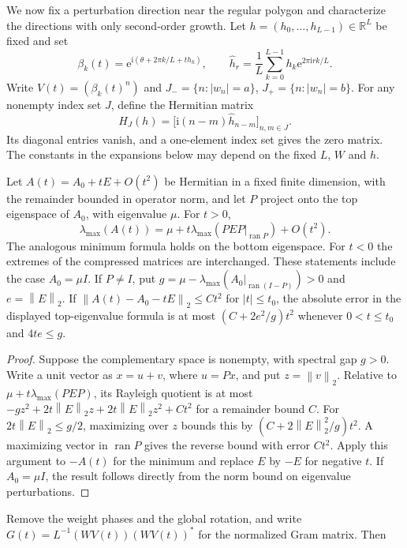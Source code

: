 \documentclass[10pt,twoside,final]{siamart1116}
\numberwithin{equation}{section}
\numberwithin{theorem}{section}
\newcommand{\R}{\mathbb R}
\newcommand{\norm}[1]{\left\lVert#1\right\rVert_2}
\newcommand{\e}{\mathrm e}
\newcommand{\ii}{\mathrm i}
\begin{document}
We now fix a perturbation direction near the regular polygon and characterize the
directions with only second-order growth. Let
$h=(h_0,\ldots,h_{L-1})\in\R^L$ be fixed and set
\begin{equation}\label{eq:direction-nodes}
\beta_k(t)=\e^{\ii(\theta+2\pi k/L+t h_k)},\qquad
\widehat h_r=\frac1L\sum_{k=0}^{L-1}h_k \e^{2\pi\ii rk/L}.
\end{equation}
Write $V(t)=(\beta_k(t)^n)$ and
$J_-=\{n:|w_n|=a\}$, $J_+=\{n:|w_n|=b\}$. For any nonempty index set $J$, define the
Hermitian matrix
\[
H_J(h)=\bigl[\ii(n-m)\widehat h_{n-m}\bigr]_{n,m\in J}.
\]
Its diagonal entries vanish, and a one-element index set gives the zero matrix. The
constants in the expansions below may depend on the fixed $L$, $W$ and $h$.

\begin{lemma}\label{lem:clusters}
Let $A(t)=A_0+tE+O(t^2)$ be Hermitian in a fixed finite dimension, with the
remainder bounded in operator norm, and let $P$ project onto the top eigenspace
of $A_0$, with eigenvalue $\mu$. For $t>0$,
\[
\lambda_{\max}(A(t))=\mu+t\lambda_{\max}(PEP|_{\operatorname{ran}P})+O(t^2).
\]
The analogous minimum formula holds on the bottom eigenspace. For $t<0$ the
extremes of the compressed matrices are interchanged. These statements include
the case $A_0=\mu I$. If $P\ne I$, put
$g=\mu-\lambda_{\max}(A_0|_{\operatorname{ran}(I-P)})>0$ and
$e=\norm E$. If $\norm{A(t)-A_0-tE}\le Ct^2$ for $|t|\le t_0$,
the absolute error in the displayed top-eigenvalue formula is at most
$(C+2e^2/g)t^2$ whenever $0<t\le t_0$ and $4te\le g$.
\end{lemma}
\begin{proof}
Suppose the complementary space is nonempty, with spectral gap $g>0$.
Write a unit vector as $x=u+v$, where $u=Px$, and put $z=\norm v$.
Relative to $\mu+t\lambda_{\max}(PEP)$, its Rayleigh quotient is at most
$-gz^2+2t\norm E z+2t\norm E z^2+Ct^2$ for a remainder bound $C$.
For $2t\norm E\le g/2$, maximizing over $z$ bounds this by
$(C+2\norm E^2/g)t^2$. A maximizing vector in $\operatorname{ran}P$ gives the
reverse bound with error $Ct^2$. Apply this argument to $-A(t)$ for the minimum
and replace $E$ by $-E$ for negative $t$. If $A_0=\mu I$, the result follows
directly from the norm bound on eigenvalue perturbations.
\end{proof}

Remove the weight phases and the global rotation, and write
$G(t)=L^{-1}(WV(t))(WV(t))^*$ for the normalized Gram matrix. Then
\end{document}
